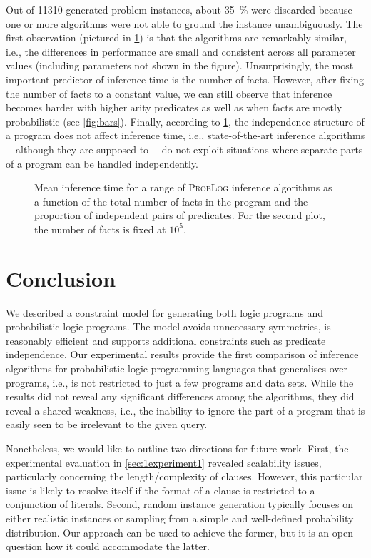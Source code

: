 Out of \num{11310} generated problem instances, about \SI{35}{\percent} were
discarded because one or more algorithms were not able to ground the instance
unambiguously. The first observation (pictured in \cref{fig:line_plots}) is that
the algorithms are remarkably similar, i.e., the differences in performance are
small and consistent across all parameter values (including parameters not shown
in the figure). Unsurprisingly, the most important predictor of inference time
is the number of facts. However, after fixing the number of facts to a constant
value, we can still observe that inference becomes harder with higher arity
predicates as well as when facts are mostly probabilistic (see \cref{fig:bars}).
Finally, according to \cref{fig:line_plots}, the independence structure of a
program does not affect inference time, i.e., state-of-the-art inference
algorithms---although they are supposed to
\citep{DBLP:conf/uai/FierensBTGR11}---do not exploit situations where separate
parts of a program can be handled independently.

\begin{figure}[t]
  \centering
  \caption{Mean inference time for a range of \textsc{ProbLog} inference
    algorithms as a function of the total number of facts in the program and the
    proportion of independent pairs of predicates. For the second plot, the
    number of facts is fixed at $10^5$.}\label{fig:line_plots}
\end{figure}

\section{Conclusion}

We described a constraint model for generating both logic programs and
probabilistic logic programs. The model avoids unnecessary symmetries, is
reasonably efficient and supports additional constraints such as predicate
independence. Our experimental results provide the first comparison of inference
algorithms for probabilistic logic programming languages that generalises over
programs, i.e., is not restricted to just a few programs and data sets. While
the results did not reveal any significant differences among the algorithms,
they did reveal a shared weakness, i.e., the inability to ignore the part of a
program that is easily seen to be irrelevant to the given query.

Nonetheless, we would like to outline two directions for future work. First, the
experimental evaluation in \cref{sec:1experiment1} revealed scalability issues,
particularly concerning the length/complexity of clauses. However, this
particular issue is likely to resolve itself if the format of a clause is
restricted to a conjunction of literals. Second, random instance generation
typically focuses on either realistic instances or sampling from a simple and
well-defined probability distribution. Our approach can be used to achieve the
former, but it is an open question how it could accommodate the latter.
